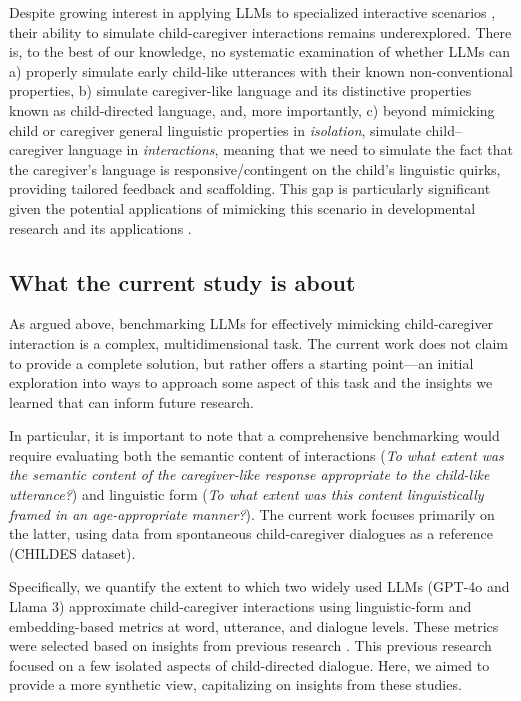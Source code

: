 Despite growing interest in applying LLMs to specialized interactive scenarios \citep{feng2024can, yang2024talk2care}, their ability to simulate child-caregiver interactions remains underexplored. There is, to the best of our knowledge, no systematic examination of whether LLMs can a) properly simulate early child-like utterances with their known non-conventional properties, b) simulate caregiver-like language and its distinctive properties known as child-directed language, and, more importantly, c) beyond mimicking child or caregiver general linguistic properties in \textit{isolation}, simulate child–caregiver language in \textit{interactions}, meaning that we need to simulate the fact that the caregiver's language is responsive/contingent on the child's linguistic quirks, providing tailored feedback and scaffolding. This gap is particularly significant given the potential applications of mimicking this scenario in developmental research and its applications \citep{zhang2024mathemyths, seo2024chacha, rasanen2024age,feng2024can}.

\subsection*{What the current study is about}

As argued above, benchmarking LLMs for effectively mimicking child-caregiver interaction is a complex, multidimensional task. The current work does not claim to provide a complete solution, but rather offers a starting point---an initial exploration into ways to approach some aspect of this task and the insights we learned that can inform future research. 

In particular, it is important to note that a comprehensive benchmarking would require evaluating both the semantic content of interactions (\textit{To what extent was the semantic content of the caregiver-like response appropriate to the child-like utterance?}) and linguistic form (\textit{To what extent was this content linguistically framed in an age-appropriate manner?}). The current work focuses primarily on the latter, using data from spontaneous child-caregiver dialogues as a reference (CHILDES dataset)\cite{macwhinney2000childes}.

Specifically, we quantify the extent to which two widely used LLMs (GPT-4o and Llama 3) approximate child-caregiver interactions using linguistic-form and embedding-based metrics at word, utterance, and dialogue levels. These metrics were selected based on insights from previous research \citep{valentini2023automatic, rasanen2024age, french2024aligning}. This previous research focused on a few isolated aspects of child-directed dialogue. Here, we aimed to provide a more synthetic view, capitalizing on insights from these studies.

